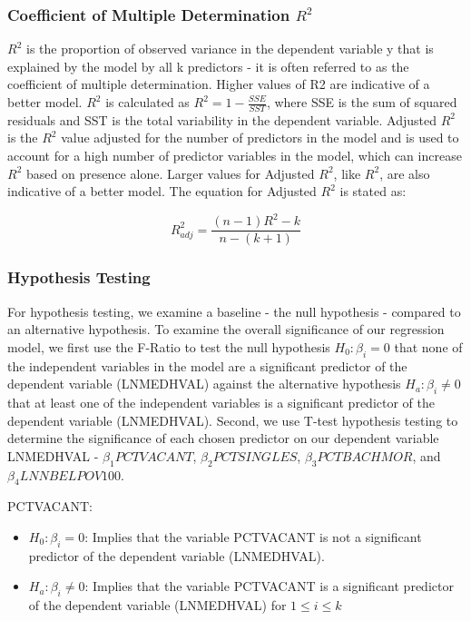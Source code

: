\documentclass[
]{article}
\providecommand{\tightlist}{%
  \setlength{\itemsep}{0pt}\setlength{\parskip}{0pt}}
\begin{document}
\hypertarget{coefficient-of-multiple-determination-r2}{%
\subsubsection{\texorpdfstring{Coefficient of Multiple Determination
\(R^2\)}{Coefficient of Multiple Determination R\^{}2}}\label{coefficient-of-multiple-determination-r2}}

\(R^2\) is the proportion of observed variance in the dependent variable
y that is explained by the model by all k predictors - it is often
referred to as the coefficient of multiple determination. Higher values
of R2 are indicative of a better model. \(R^2\) is calculated as
\(R^2 = 1 - \frac{SSE}{SST}\), where SSE is the sum of squared residuals
and SST is the total variability in the dependent variable. Adjusted
\(R^2\) is the \(R^2\) value adjusted for the number of predictors in
the model and is used to account for a high number of predictor
variables in the model, which can increase \(R^2\) based on presence
alone. Larger values for Adjusted \(R^2\), like \(R^2\), are also
indicative of a better model. The equation for Adjusted \(R^2\) is
stated as:

\[R_{adj}^2 = \frac{(n-1)R^2 - k}{n-(k+1)}\]

\hypertarget{hypothesis-testing}{%
\subsubsection{Hypothesis Testing}\label{hypothesis-testing}}

For hypothesis testing, we examine a baseline - the null hypothesis -
compared to an alternative hypothesis. To examine the overall
significance of our regression model, we first use the F-Ratio to test
the null hypothesis \(H_0: β_i=0\) that none of the independent
variables in the model are a significant predictor of the dependent
variable (LNMEDHVAL) against the alternative hypothesis \(H_a: β_i≠0\)
that at least one of the independent variables is a significant
predictor of the dependent variable (LNMEDHVAL). Second, we use T-test
hypothesis testing to determine the significance of each chosen
predictor on our dependent variable LNMEDHVAL - \(β_1PCTVACANT\),
\(β_2PCTSINGLES\), \(β_3PCTBACHMOR\), and \(β_4LNNBELPOV100\).

PCTVACANT:

\begin{itemize}
\tightlist
\item
  \(H_0: β_i=0\): Implies that the variable PCTVACANT is not a
  significant predictor of the dependent variable (LNMEDHVAL).
\item
  \(H_a: β_i≠0\): Implies that the variable PCTVACANT is a significant
  predictor of the dependent variable (LNMEDHVAL) for
  \(1 \leq i \leq k\)
\end{itemize}
\end{document}
